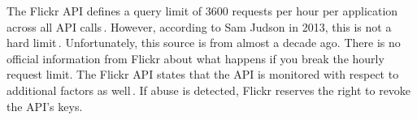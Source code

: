 The Flickr \gls{API} defines a query limit of \num{3600} requests per hour per application across all \gls{API} calls\,\cite{flickrinc.FlickrFlickrDeveloper}. However, according to Sam Judson in 2013, this is not a hard limit\,\cite{WhatAreAPI2013}. Unfortunately, this source is from almost a decade ago. There is no official information from Flickr about what happens if you break the hourly request limit. The Flickr \gls{API} states that the \gls{API} is monitored with respect to additional factors as well\,\cite{flickrinc.FlickrFlickrDeveloper}. If abuse is detected, Flickr reserves the right to revoke the \gls{API}'s keys.